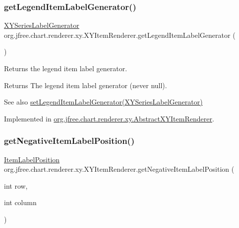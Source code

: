 \subsubsection{\texorpdfstring{get\+Legend\+Item\+Label\+Generator()}{getLegendItemLabelGenerator()}}
{\footnotesize\ttfamily \mbox{\hyperlink{interfaceorg_1_1jfree_1_1chart_1_1labels_1_1_x_y_series_label_generator}{X\+Y\+Series\+Label\+Generator}} org.\+jfree.\+chart.\+renderer.\+xy.\+X\+Y\+Item\+Renderer.\+get\+Legend\+Item\+Label\+Generator (\begin{DoxyParamCaption}{ }\end{DoxyParamCaption})}

Returns the legend item label generator.

\begin{DoxyReturn}{Returns}
The legend item label generator (never {\ttfamily null}).
\end{DoxyReturn}
\begin{DoxySeeAlso}{See also}
\mbox{\hyperlink{interfaceorg_1_1jfree_1_1chart_1_1renderer_1_1xy_1_1_x_y_item_renderer_ad57737bb623ca88dec6dd3fb90a3e8fe}{set\+Legend\+Item\+Label\+Generator(\+X\+Y\+Series\+Label\+Generator)}} 
\end{DoxySeeAlso}


Implemented in \mbox{\hyperlink{classorg_1_1jfree_1_1chart_1_1renderer_1_1xy_1_1_abstract_x_y_item_renderer_adb671043619b9b91070ddb7c8554618a}{org.\+jfree.\+chart.\+renderer.\+xy.\+Abstract\+X\+Y\+Item\+Renderer}}.

\mbox{\label{interfaceorg_1_1jfree_1_1chart_1_1renderer_1_1xy_1_1_x_y_item_renderer_a958e8cdbe6dd3eeebad86e0d765ae6c2}} 
\subsubsection{\texorpdfstring{get\+Negative\+Item\+Label\+Position()}{getNegativeItemLabelPosition()}\hspace{0.1cm}{\footnotesize\ttfamily [1/2]}}
{\footnotesize\ttfamily \mbox{\hyperlink{classorg_1_1jfree_1_1chart_1_1labels_1_1_item_label_position}{Item\+Label\+Position}} org.\+jfree.\+chart.\+renderer.\+xy.\+X\+Y\+Item\+Renderer.\+get\+Negative\+Item\+Label\+Position (\begin{DoxyParamCaption}\item[{int}]{row,  }\item[{int}]{column }\end{DoxyParamCaption})}

